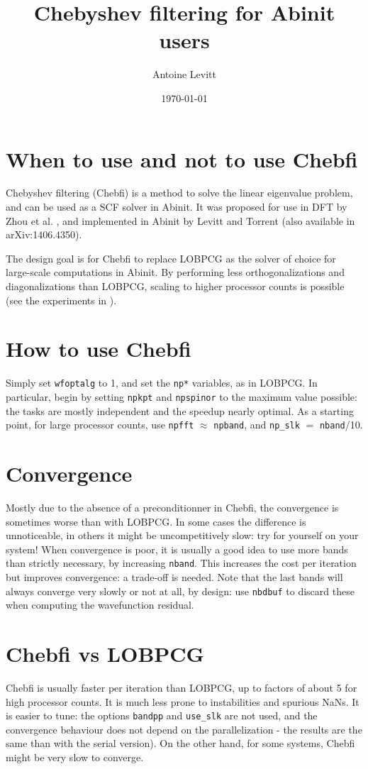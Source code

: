 \documentclass[11pt]{article}
\title{Chebyshev filtering for Abinit users}
\author{Antoine Levitt}
\date{\today}
\begin{document}
\maketitle
\tableofcontents
\section{When to use and not to use Chebfi}
Chebyshev filtering (Chebfi) is a method to solve the linear
eigenvalue problem, and can be used as a SCF solver in Abinit. It was
proposed for use in DFT by Zhou et al. \cite{zhou2006self}, and
implemented in Abinit by Levitt and Torrent \cite{levitt2014parallel} 
(also available in arXiv:1406.4350).

The design goal is for Chebfi to replace LOBPCG as the solver of
choice for large-scale computations in Abinit. By performing less
orthogonalizations and diagonalizations than LOBPCG, scaling to higher
processor counts is possible (see the experiments in
\cite{levitt2014parallel}).

\section{How to use Chebfi}
Simply set \texttt{wfoptalg} to 1, and set the \texttt{np*} variables,
as in LOBPCG. In particular, begin by setting \texttt{npkpt} and
\texttt{npspinor} to the maximum value possible: the tasks are mostly
independent and the speedup nearly optimal. As a starting point, for
large processor counts, use \texttt{npfft} $\approx$ \texttt{npband},
and \texttt{np\_slk} $=$ \texttt{nband}/10.
\section{Convergence}
Mostly due to the absence of a preconditionner in Chebfi, the
convergence is sometimes worse than with LOBPCG. In some cases the
difference is unnoticeable, in others it might be uncompetitively
slow: try for yourself on your system! When convergence is poor, it is
usually a good idea to use more bands than strictly necessary, by
increasing \texttt{nband}. This increases the cost per iteration but
improves convergence: a trade-off is needed. Note that the last bands
will always converge very slowly or not at all, by design: use
\texttt{nbdbuf} to discard these when computing the wavefunction
residual.
\section{Chebfi vs LOBPCG}
Chebfi is usually faster per iteration than LOBPCG, up to factors of
about 5 for high processor counts. It is much less prone to
instabilities and spurious NaNs. It is easier to tune: the options
\texttt{bandpp} and \texttt{use\_slk} are not used, and the
convergence behaviour does not depend on the parallelization - the
results are the same than with the serial version). On the other hand,
for some systems, Chebfi might be very slow to converge.
\end{document}
